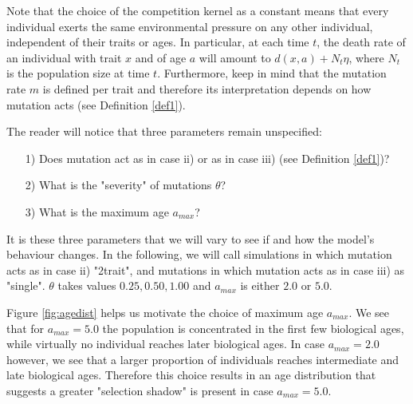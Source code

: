 \documentclass[11pt, a4paper]{article}
\theoremstyle{definition}
\begin{document}
    \noindent Note that the choice of the competition kernel as a constant means that every individual exerts the same environmental pressure on any other individual, independent of their traits or ages. In particular, at each time $t$, the death rate of an individual with trait $x$ and of age $a$ will amount to $d(x,a) + N_t \eta$, where $N_t$ is the population size at time $t$. Furthermore, keep in mind that the mutation rate $m$ is defined per trait and therefore its
    interpretation depends on how mutation acts (see Definition \ref{def1}).

    The reader will notice that three parameters remain unspecified:
    \begin{itemize}
        \item[1)] Does mutation act as in case ii) or as in case iii) (see Definition \ref{def1})?
        \item[2)] What is the "severity" of mutations $\theta$?
        \item[3)] What is the maximum age $a_{max}$?
    \end{itemize}

    \noindent It is these three parameters that we will vary to see if and how the model's behaviour changes. In the following, we will call simulations in which mutation acts as in case ii) "2trait", and mutations in which mutation acts as in case iii) as "single". $\theta$ takes values $0.25, 0.50, 1.00$ and $a_{max}$ is either $2.0$ or $5.0$.

    Figure \ref{fig:agedist} helps us motivate the choice of maximum age $a_{max}$. We see that for $a_{max} = 5.0$ the population is concentrated in the first few biological ages, while virtually no individual reaches later biological ages. In case $a_{max} = 2.0$ however, we see that a larger proportion of individuals reaches intermediate and late biological ages. Therefore this choice results in an age distribution that suggests a greater "selection shadow" is present in case $a_{max} = 5.0$.
\end{document}
